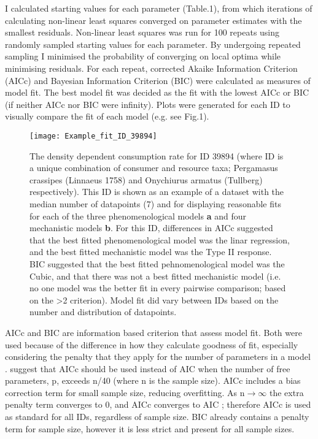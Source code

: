 \documentclass[11pt]{article}
\begin{document}
            I calculated starting values for each parameter (Table.1), from which iterations of calculating non-linear least squares converged on parameter estimates with the smallest residuals. Non-linear least squares was run for 100 repeats using randomly sampled starting values for each parameter. By undergoing repeated sampling I minimised the probability of converging on local optima while minimising residuals. For each repeat, corrected Akaike Information Criterion (AICc) and Bayesian Information Criterion (BIC) were calculated as measures of model fit. The best model fit was decided as the fit with the lowest AICc or BIC (if neither AICc nor BIC were infinity). Plots were generated for each ID to visually compare the fit of each model (e.g. see Fig.1).

            \begin{figure}[htpb]
                \texttt{[image: Example\_fit\_ID\_39894]}
                \centering
                \caption{The density dependent consumption rate for ID 39894 (where ID is a unique combination of consumer and resource taxa; Pergamasus crassipes (Linnaeus 1758) and Onychiurus armatus (Tullberg) respectively). This ID is shown as an example of a dataset with the median number of datapoints (7) and for displaying reasonable fits for each of the three phenomenological models \textbf{a} and four mechanistic models \textbf{b}. For this ID, differences in AICc suggested that the best fitted phenomenological model was the linar regression, and the best fitted mechanistic model was the Type II response. BIC suggested that the best fitted pehnomenological model was the Cubic, and that there was not a best fitted mechanistic model (i.e. no one model was the better fit in every pairwise comparison; based on the \textgreater2 criterion). Model fit did vary between IDs based on the number and distribution of datapoints.}
            \end{figure}
            
            AICc and BIC are information based criterion that assess model fit. Both were used because of the difference in how they calculate goodness of fit, especially considering the penalty that they apply for the number of parameters in a model \citep{burnhamandanderson2004}. \citet{johnson2004model} suggest that AICc should be used instead of AIC when the number of free parameters, p, exceeds n/40 (where n is the sample size). AICc includes a bias correction term for small sample size, reducing overfitting. As \(\text{n} \rightarrow \text{$\infty$}\) the extra penalty term converges to 0, and AICc converges to AIC \citep{burnhamandanderson2004}; therefore AICc is used as standard for all IDs, regardless of sample size. BIC already contains a penalty term for sample size, however it is less strict and present for all sample sizes.
\end{document}
